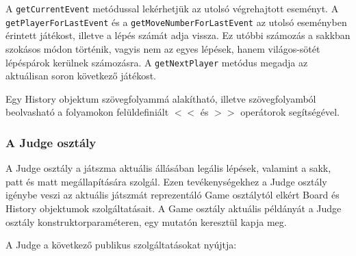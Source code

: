 \documentclass[12pt, twoside]{report}
\begin{document}
A {\tt getCurrentEvent} metódussal lekérhetjük az utolsó végrehajtott eseményt. A {\tt getPlayerForLastEvent} és a {\tt getMoveNumberForLastEvent} az utolsó eseményben érintett játékost, illetve a lépés számát adja vissza. Ez utóbbi számozás a sakkban szokásos módon történik, vagyis nem az egyes lépések, hanem világos-sötét lépéspárok kerülnek számozásra. A {\tt getNextPlayer} metódus megadja az aktuálisan soron következő játékost.

Egy History objektum szövegfolyammá alakítható, illetve szövegfolyamból beolvasható a folyamokon felüldefiniált $<<$ és $>>$ operátorok segítségével.

\subsubsection{A Judge osztály}

A Judge osztály a játszma aktuális állásában legális lépések, valamint a sakk, patt és matt megállapítására szolgál. Ezen tevékenységekhez a Judge osztály igénybe veszi az aktuális játszmát reprezentáló Game osztálytól elkért Board és History objektumok szolgáltatásait. A Game osztály aktuális példányát a Judge osztály konstruktorparaméteren, egy mutatón keresztül kapja meg.

A Judge a következő publikus szolgáltatásokat nyújtja:
\end{document}
